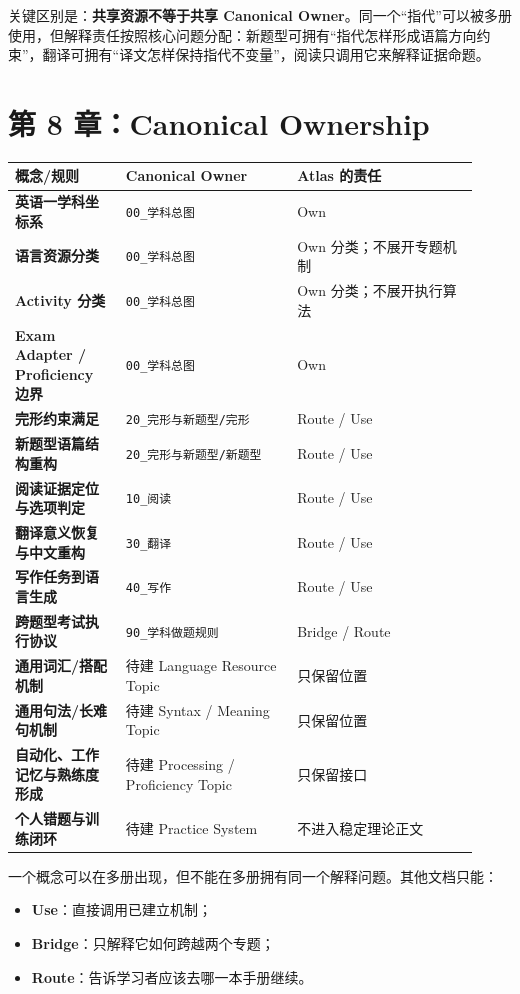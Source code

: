 \documentclass[11pt,a4paper]{ctexart}
\newcommand{\kw}[1]{\textbf{#1}}
\begin{document}
关键区别是：\kw{共享资源不等于共享 Canonical Owner}。同一个“指代”可以被多册使用，但解释责任按照核心问题分配：新题型可拥有“指代怎样形成语篇方向约束”，翻译可拥有“译文怎样保持指代不变量”，阅读只调用它来解释证据命题。

\section{第 8 章：Canonical Ownership}

\begin{center}
\small
\begin{longtable}{>{\bfseries}p{0.22\linewidth} p{0.34\linewidth} p{0.36\linewidth}}
\toprule
概念/规则 & Canonical Owner & Atlas 的责任 \\
\midrule
英语一学科坐标系 & \texttt{00\_学科总图} & Own \\
语言资源分类 & \texttt{00\_学科总图} & Own 分类；不展开专题机制 \\
Activity 分类 & \texttt{00\_学科总图} & Own 分类；不展开执行算法 \\
Exam Adapter / Proficiency 边界 & \texttt{00\_学科总图} & Own \\
完形约束满足 & \texttt{20\_完形与新题型/完形} & Route / Use \\
新题型语篇结构重构 & \texttt{20\_完形与新题型/新题型} & Route / Use \\
阅读证据定位与选项判定 & \texttt{10\_阅读} & Route / Use \\
翻译意义恢复与中文重构 & \texttt{30\_翻译} & Route / Use \\
写作任务到语言生成 & \texttt{40\_写作} & Route / Use \\
跨题型考试执行协议 & \texttt{90\_学科做题规则} & Bridge / Route \\
通用词汇/搭配机制 & 待建 Language Resource Topic & 只保留位置 \\
通用句法/长难句机制 & 待建 Syntax / Meaning Topic & 只保留位置 \\
自动化、工作记忆与熟练度形成 & 待建 Processing / Proficiency Topic & 只保留接口 \\
个人错题与训练闭环 & 待建 Practice System & 不进入稳定理论正文 \\
\bottomrule
\end{longtable}
\end{center}

\begin{warn}
一个概念可以在多册出现，但不能在多册拥有同一个解释问题。其他文档只能：
\begin{itemize}
  \item \kw{Use}：直接调用已建立机制；
  \item \kw{Bridge}：只解释它如何跨越两个专题；
  \item \kw{Route}：告诉学习者应该去哪一本手册继续。
\end{itemize}
\end{warn}
\end{document}
